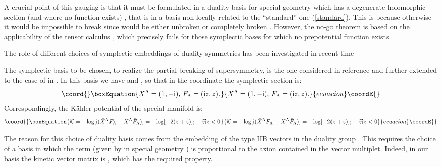 \documentclass[a4paper,12pt]{article}
\begin{document}
A crucial point of this gauging is that it must be formulated in a duality basis \cite{gz}
 for special geometry which has a degenerate holomorphic
section \coordHE{} (and where no function \coordHE{} exists) \cite{cdfv,fgp}, 
that is in a basis non locally related to the ``standard'' one (\ref{standard}).
This is because otherwise it would be impossible to break \coordHE{} since \coordHE{}
would be either unbroken or completely broken \cite{cgp1,cgp2}.
However, the no-go theorem \cite{cgp2} is based on the applicability of the \coordHE{} tensor calculus \cite{dlv}, 
which precisely fails for those symplectic
bases for which no prepotential function \coordHE{} exists.

The role of different choices of symplectic embeddings of duality symmetries has been investigated in recent time 
\cite{adfl2,adfl3,hull}

The symplectic basis to be chosen, to realize the partial breaking of supersymmetry, is the one considered in reference \cite{fgp}
and further extended to the case of \coordHE{} in \cite{dflv}.
In this basis we have
\coordHE{} and \coordHE{}, so that in the \coordHE{} coordinate \coordHE{} the symplectic section is:
\begin{equation}\coord{}\boxEquation{
X^\Lambda =(1,-\ii) , \, F_\Lambda =(\ii z , z).
\label{basis}
}{
X^\Lambda =(1,-\ii) , \, F_\Lambda =(\ii z , z).
}{ecuacion}\coordE{}\end{equation}
Correspondingly, the K\"ahler potential of the \coordHE{} special manifold is:
\begin{equation}\coord{}\boxEquation{
{\mathcal K} = - {\rm log}[\ii(\bar X^\Lambda F_\Lambda - X^\Lambda \bar F_\Lambda )]= - {\rm log}[-2(z+\bar z)] ; \quad \, \Re z < 0
}{
{\mathcal K} = - {\rm log}[\ii(\bar X^\Lambda F_\Lambda - X^\Lambda \bar F_\Lambda )]= - {\rm log}[-2(z+\bar z)] ; \quad \, \Re z < 0
}{ecuacion}\coordE{}\end{equation}   

The reason for this choice of duality basis comes from the embedding of the type IIB vectors in the duality group \cite{fp1,kst,dfv}.
This requires the choice of a basis in which the \myHighlight{$\theta$}\coordHE{} term (given by \coordHE{} in special geometry
\cite{abcdffm}) is proportional to the axion contained in the vector multiplet. Indeed, in our basis the kinetic vector matrix is
\coordHE{}, which has the required property.
\end{document}
